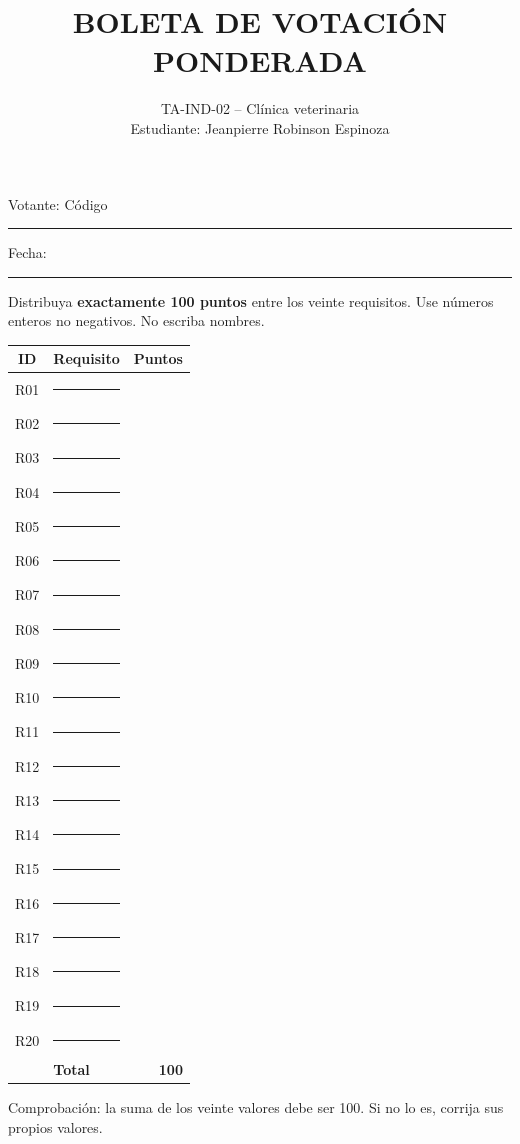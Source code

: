 \documentclass[11pt,a4paper]{article}
\title{\textbf{BOLETA DE VOTACIÓN PONDERADA}}
\author{TA-IND-02 -- Clínica veterinaria\\
Estudiante: Jeanpierre Robinson Espinoza}
\date{}
\begin{document}
\maketitle

\noindent Votante: Código \rule{2.5cm}{0.4pt}\quad Fecha: \rule{2.5cm}{0.4pt}

\noindent Distribuya \textbf{exactamente 100 puntos} entre los veinte requisitos. Use números enteros no negativos. No escriba nombres.

\vspace{0.4cm}

\begin{tabular}{@{}clr@{}}
\toprule
ID & Requisito & Puntos \\
\midrule
R01 & \rule{9cm}{0.4pt} & \\
R02 & \rule{9cm}{0.4pt} & \\
R03 & \rule{9cm}{0.4pt} & \\
R04 & \rule{9cm}{0.4pt} & \\
R05 & \rule{9cm}{0.4pt} & \\
R06 & \rule{9cm}{0.4pt} & \\
R07 & \rule{9cm}{0.4pt} & \\
R08 & \rule{9cm}{0.4pt} & \\
R09 & \rule{9cm}{0.4pt} & \\
R10 & \rule{9cm}{0.4pt} & \\
R11 & \rule{9cm}{0.4pt} & \\
R12 & \rule{9cm}{0.4pt} & \\
R13 & \rule{9cm}{0.4pt} & \\
R14 & \rule{9cm}{0.4pt} & \\
R15 & \rule{9cm}{0.4pt} & \\
R16 & \rule{9cm}{0.4pt} & \\
R17 & \rule{9cm}{0.4pt} & \\
R18 & \rule{9cm}{0.4pt} & \\
R19 & \rule{9cm}{0.4pt} & \\
R20 & \rule{9cm}{0.4pt} & \\
\midrule
 & \textbf{Total} & \textbf{100} \\
\bottomrule
\end{tabular}

\vspace{0.5cm}

\noindent Comprobación: la suma de los veinte valores debe ser 100. Si no lo es, corrija sus propios valores.
\end{document}
